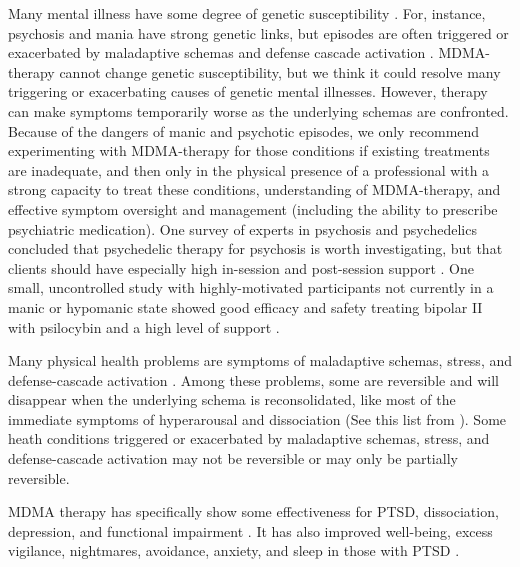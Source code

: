 \documentclass[12pt,letterpaper]{article}
\begin{document}
Many mental illness have some degree of genetic susceptibility \cite{plomin2016top}. For, instance, psychosis and mania have strong genetic links, but episodes are often triggered or exacerbated by maladaptive schemas and defense cascade activation \cite{winkelPsychosisStress,Umeoka2021stressmania}. MDMA-therapy cannot change genetic susceptibility, but we think it could resolve many triggering or exacerbating causes of genetic mental illnesses. However, therapy can make symptoms temporarily worse as the underlying schemas are confronted. Because of the dangers of manic and psychotic episodes, we only recommend experimenting with MDMA-therapy for those conditions if existing treatments are inadequate, and then only in the physical presence of a professional with a strong capacity to treat these conditions, understanding of MDMA-therapy, and effective symptom oversight and management (including the ability to prescribe psychiatric medication). One survey of experts in psychosis and psychedelics concluded that psychedelic therapy for psychosis is worth investigating, but that clients should have especially high in-session and post-session support \cite{la2022Psychosis}. One small, uncontrolled study with highly-motivated participants not currently in a manic or hypomanic state showed good efficacy and safety treating bipolar II with psilocybin and a high level of support \cite{aaronsonBipolarII}.

Many physical health problems are symptoms of maladaptive schemas, stress, and defense-cascade activation \cite{kozlowskaDefenseCascade,eckerUnlocking}. Among these problems, some are reversible and will disappear when the underlying schema is reconsolidated, like most of the immediate symptoms of hyperarousal and dissociation (See this list from \textcite{cheetahSigns}). Some heath conditions triggered or exacerbated by maladaptive schemas, stress, and defense-cascade activation may not be reversible or may only be partially reversible. 

MDMA therapy has specifically show some effectiveness for PTSD, dissociation, depression, and functional impairment \cite{greenMeta}. It has also improved well-being, excess vigilance, nightmares, avoidance, anxiety, and sleep in those with PTSD \cite{smithSystematic}.
\end{document}
